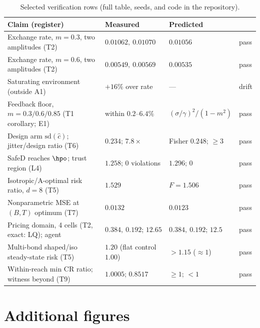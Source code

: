 \documentclass{article}
\begin{document}
\begin{table}[h]
\centering
\small
\caption{Selected verification rows (full table, seeds, and code in the repository).}
\label{tab:results}
\begin{tabular}{@{}llll@{}}
\toprule
Claim (register) & Measured & Predicted & \\
\midrule
Exchange rate, $m{=}0.3$, two amplitudes (T2) & $0.01062,\ 0.01070$ & $0.01056$ & pass \\
Exchange rate, $m{=}0.6$, two amplitudes (T2) & $0.00549,\ 0.00569$ & $0.00535$ & pass \\
Saturating environment (outside A1) & $+16\%$ over rate & --- & drift \\
Feedback floor, $m{=}0.3/0.6/0.85$ (T1 corollary; E1) & within $0.2$--$6.4\%$ & $(\sigma/\gamma)^2/(1{-}m^2)$ & pass \\
Design arm $\mathrm{sd}(\hat c)$; jitter/design ratio (T6) & $0.234$; $7.8\times$ & Fisher $0.248$; $\ge 3$ & pass \\
SafeD reaches $\hpo$; trust region (L4) & $1.258$; $0$ violations & $1.296$; $0$ & pass \\
Isotropic/A-optimal risk ratio, $d{=}8$ (T5) & $1.529$ & $F = 1.506$ & pass \\
Nonparametric MSE at $(B,T)$ optimum (T7) & $0.0132$ & $0.0123$ & pass \\
Pricing domain, 4 cells (T2, exact: LQ); agent & $0.384,\ 0.192$; $12.65$ & $0.384,\ 0.192$; $12.5$ & pass \\
Multi-bond shaped/iso steady-state risk (T5) & $1.20$ (flat control $1.00$) & $>1.15$ ($\approx 1$) & pass \\
Within-reach min CR ratio; witness beyond (T9) & $1.0005$; $0.8517$ & $\ge 1$; $< 1$ & pass \\
\bottomrule
\end{tabular}
\end{table}

\section{Additional figures}
\label{app:figures}
\end{document}
